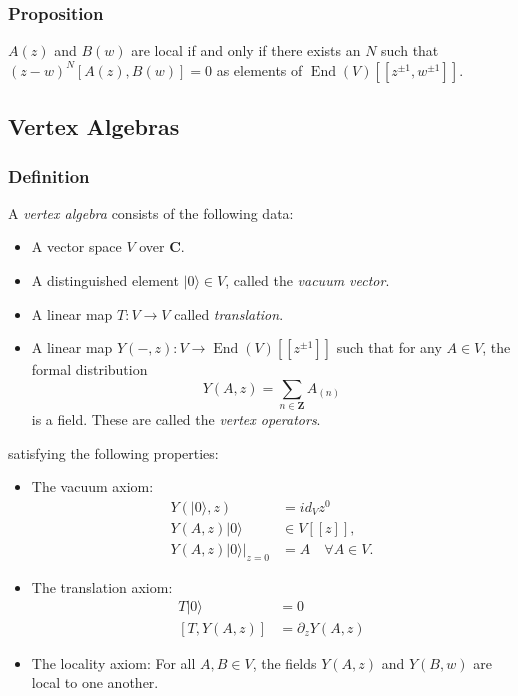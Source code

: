 \documentclass{article}
\newcommand{\CC}{\mathbold{C}}
\newcommand{\ZZ}{\mathbold{Z}}
\newcommand{\vac}{|0\rangle}
\DeclareMathOperator{\End}{End}
\begin{document}
\subsubsection{Proposition}
$A(z)$ and $B(w)$ are local if and only if there exists an $N$ such that $(z-w)^N[A(z),B(w)]=0$ as elements of $\End(V)[[z^{\pm 1},w^{\pm 1}]]$.

\subsection{Vertex Algebras}

\subsubsection{Definition}
A \textit{vertex algebra} consists of the following data:
\begin{itemize}
\item A vector space $V$ over $\CC$.
\item A distinguished element $\vac \in V$, called the \textit{vacuum vector}.
\item A linear map $T: V \rightarrow V$ called \textit{translation}.
\item A linear map $Y(-,z): V \rightarrow \End(V)[[z^{\pm 1}]]$ such that for any $A \in V$, the formal distribution
  \[Y(A,z)=\sum_{n \in \ZZ} A_{(n)} \]
  is a field.  These are called the \textit{vertex operators}.
\end{itemize}
satisfying the following properties:
\begin{itemize}
\item The vacuum axiom:
  \begin{align}
    Y(\vac,z)&=id_Vz^0\\
    Y(A,z)\vac &\in V[[z]],\\
    Y(A,z)\vac|_{z=0}&=A\quad \forall A \in V.
  \end{align}
\item The translation axiom:
  \begin{align}
    T \vac &= 0\\
    [T,Y(A,z)]&=\partial_z Y(A,z)
  \end{align}
\item The locality axiom: For all $A,B \in V$, the fields $Y(A,z)$ and $Y(B,w)$ are local to one another.
\end{itemize}
\end{document}
